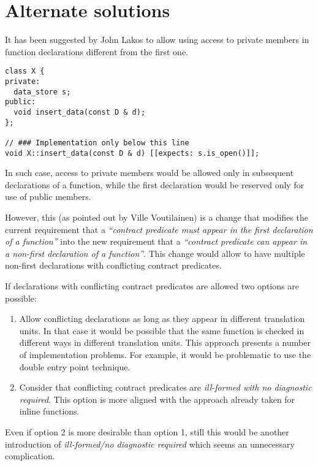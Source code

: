 \section{Alternate solutions}

It has been suggested by John Lakos to allow using access to private members in function
declarations different from the first one.

\begin{lstlisting}
class X {
private:
  data_store s;
public:
  void insert_data(const D & d);
};

// ### Implementation only below this line
void X::insert_data(const D & d) [[expects: s.is_open()]];
\end{lstlisting}

In such case, access to private members would be allowed only in subsequent
declarations of a function, while the first declaration would be reserved only
for use of public members.

However, this (as pointed out by Ville Voutilainen) is a change that modifies the
current requirement that a \emph{``contract predicate must appear in the first
declaration of a function''} into the new requirement that a \emph{``contract
predicate can appear in a non-first declaration of a function''}. This change
would allow to have multiple non-first declarations with conflicting contract
predicates.

If declarations with conflicting contract predicates are allowed two options are
possible:

\begin{enumerate}

\item Allow conflicting declarations as long as they appear in different
translation units. In that case it would be possible that the same function is
checked in different ways in different translation units. This approach presents
a number of implementation problems. For example, it would be problematic to use
the double entry point technique.

\item Consider that conflicting contract predicates are \emph{ill-formed with no
diagnostic required}. This option is more aligned with the approach already taken
for inline functions.

\end{enumerate}

Even if option 2 is more desirable than option 1, still this would be another
introduction of \emph{ill-formed/no diagnostic required} which seems an
unnecessary complication.

